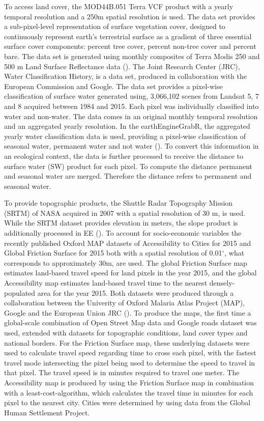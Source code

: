 To access land cover, the MOD44B.051 Terra VCF product with a yearly temporal resolution and a 250m spatial resolution is used. The data set provides a sub-pixel-level representation of surface vegetation cover, designed to continuously represent earth's terrestrial surface as a gradient of three essential surface cover components: percent tree cover, percent non-tree cover and percent bare. The data set is generated using monthly composites of Terra Modis 250 and 500 m Land Surface Reflectance data (\cite{hansen2006vegetation}).
The Joint Research Center (JRC), Water Classification History, is a data set, produced in collaboration with the European Commission and Google. The data set provides a pixel-wise classification of surface water generated using, 3,066,102 scenes from Landsat 5, 7 and 8 acquired between 1984 and 2015. Each pixel was individually classified into water and non-water. The data comes in an original monthly temporal resolution and an aggregated yearly resolution. In the earthEngineGrabR, the aggregated yearly water classification data is used, providing a pixel-wise classification of seasonal water, permanent water and not water (\cite{pekel2016high}). To convert this information in an ecological context, the data is further processed to receive the distance to surface water (SW) product for each pixel. To compute the distance permanent and seasonal water are merged. Therefore the distance refers to permanent and seasonal water.

To provide topographic products, the Shuttle Radar Topography Mission (SRTM) of NASA acquired in 2007 with a spatial resolution of 30 m, is used. While the SRTM dataset provides elevation in meters, the slope product is additionally processed in EE (\cite{farr2007shuttle}). To account for socio-economic variables the recently published Oxford MAP datasets of Accessibility to Cities for 2015 and Global Friction Surface for 2015 both with a spatial resolution of 0.01$^\circ$, what corresponds to approximately 30m, are used. The global Friction Surface map estimates land-based travel speed for land pixels in the year 2015, and the global Accessibility map estimates land-based travel time to the nearest densely-populated area for the year 2015. Both datasets were produced through a collaboration between the Univerity of Oxford Malaria Atlas Project (MAP), Google and the European Union JRC (\cite{weiss2018global}). To produce the maps, the first time a global-scale combination of Open Street Map data and Google roads dataset was used, extended with datasets for topographic conditions, land cover types and national borders.
For the Friction Surface map, these underlying datasets were used to calculate travel speed regarding time to cross each pixel, with the fastest travel mode intersecting the pixel being used to determine the speed to travel in that pixel. The travel speed is in minutes required to travel one meter. The Accessibility map is produced by using the Friction Surface map in combination with a least-cost-algorithm, which calculates the travel time in minutes for each pixel to the nearest city. Cities were determined by using data from the Global Human Settlement Project.  

